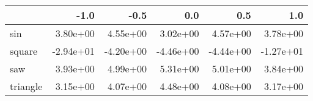 \begin{tabular}{lrrrrr}
\toprule
{} &      -1.0 &      -0.5 &       0.0 &       0.5 &       1.0 \\
\midrule
sin      &  3.80e+00 &  4.55e+00 &  3.02e+00 &  4.57e+00 &  3.78e+00 \\
square   & -2.94e+01 & -4.20e+00 & -4.46e+00 & -4.44e+00 & -1.27e+01 \\
saw      &  3.93e+00 &  4.99e+00 &  5.31e+00 &  5.01e+00 &  3.84e+00 \\
triangle &  3.15e+00 &  4.07e+00 &  4.48e+00 &  4.08e+00 &  3.17e+00 \\
\bottomrule
\end{tabular}

